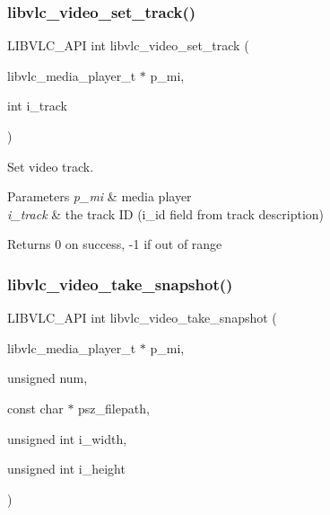 \subsubsection{\texorpdfstring{libvlc\+\_\+video\+\_\+set\+\_\+track()}{libvlc\_video\_set\_track()}}
{\footnotesize\ttfamily L\+I\+B\+V\+L\+C\+\_\+\+A\+PI int libvlc\+\_\+video\+\_\+set\+\_\+track (\begin{DoxyParamCaption}\item[{libvlc\+\_\+media\+\_\+player\+\_\+t $\ast$}]{p\+\_\+mi,  }\item[{int}]{i\+\_\+track }\end{DoxyParamCaption})}

Set video track.


\begin{DoxyParams}{Parameters}
{\em p\+\_\+mi} & media player \\
\hline
{\em i\+\_\+track} & the track ID (i\+\_\+id field from track description) \\
\hline
\end{DoxyParams}
\begin{DoxyReturn}{Returns}
0 on success, -\/1 if out of range 
\end{DoxyReturn}
\mbox{\label{group__libvlc__video_ga9b0a3870ce962aa0358050b2d5a59143}} 
\subsubsection{\texorpdfstring{libvlc\+\_\+video\+\_\+take\+\_\+snapshot()}{libvlc\_video\_take\_snapshot()}}
{\footnotesize\ttfamily L\+I\+B\+V\+L\+C\+\_\+\+A\+PI int libvlc\+\_\+video\+\_\+take\+\_\+snapshot (\begin{DoxyParamCaption}\item[{libvlc\+\_\+media\+\_\+player\+\_\+t $\ast$}]{p\+\_\+mi,  }\item[{unsigned}]{num,  }\item[{const char $\ast$}]{psz\+\_\+filepath,  }\item[{unsigned int}]{i\+\_\+width,  }\item[{unsigned int}]{i\+\_\+height }\end{DoxyParamCaption})}

